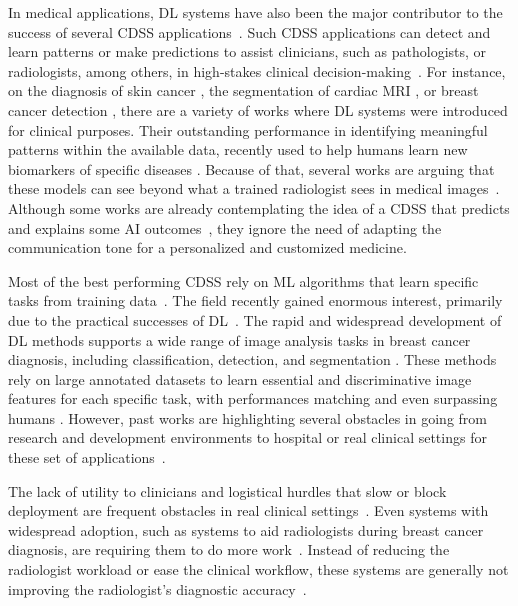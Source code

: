 In medical applications, DL systems have also been the major contributor to the success of several CDSS applications~\cite{esteva2019guide}.
Such CDSS applications can detect and learn patterns or make predictions to assist clinicians, such as pathologists, or radiologists, among others, in high-stakes clinical decision-making~\cite{10.1145/3555157}.
For instance, on the diagnosis of skin cancer \cite{esteva2017dermatologist}, the segmentation of cardiac MRI \cite{8759179}, or breast cancer detection \cite{MAICAS2019101562}, there are a variety of works where DL systems were introduced for clinical purposes.
Their outstanding performance in identifying meaningful patterns within the available data, recently used to help humans learn new biomarkers of specific diseases \cite{wang2019deep}.
Because of that, several works are arguing that these models can see beyond what a trained radiologist sees in medical images~\cite{mckinney2020international, Rajpurkar2022, MAIERHEIN2022102306}.
Although some works are already contemplating the idea of a CDSS that predicts and explains some AI outcomes~\cite{MAICAS2019101562, CALISTO2022102285}, they ignore the need of adapting the communication tone for a personalized and customized medicine.

Most of the best performing CDSS rely on ML algorithms that learn specific tasks from training data~\cite{10.1001/jama.2018.17163, Zaman49, 10.1145/3399715.3399744}.
The field recently gained enormous interest, primarily due to the practical successes of DL~\cite{10.1007/978-3-030-22871-2_67}.
The rapid and widespread development of DL methods supports a wide range of image analysis tasks in breast cancer diagnosis, including classification, detection, and segmentation \cite{lecun2015deep, DIN2022106073}.
These methods rely on large annotated datasets to learn essential and discriminative image features for each specific task, with performances matching and even surpassing humans \cite{esteva2017dermatologist}.
However, past works are highlighting several obstacles in going from research and development environments to hospital or real clinical settings for these set of applications~\cite{https://doi.org/10.3322/caac.21552, 10.1145/3313831.3376718}.

The lack of utility to clinicians and logistical hurdles that slow or block deployment are frequent obstacles in real clinical settings~\cite{Elwyn2013, Musen2021}.
Even systems with widespread adoption, such as systems to aid radiologists during breast cancer diagnosis, are requiring them to do more work~\cite{KOHLI2018535}.
Instead of reducing the radiologist workload or ease the clinical workflow, these systems are generally not improving the radiologist's diagnostic accuracy~\cite{Cole2014fi, KOHLI2018535}.

